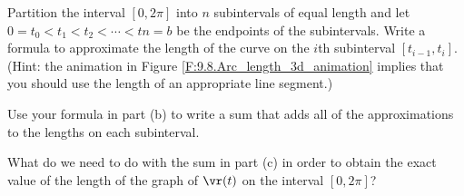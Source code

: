\begin{pa}

    \item Partition the interval $[0,2\pi]$ into $n$ subintervals of equal length and let $0 = t_0 < t_1 < t_2 < \cdots < tn = b$ be the endpoints of the subintervals. Write a formula to approximate the length of the curve on the $i$th subinterval $[t_{i-1},t_i]$. (Hint: the animation in Figure \ref{F:9.8.Arc_length_3d_animation} implies that you should use the length of an appropriate line segment.)

    \item Use your formula in part (b) to write a sum that adds all of the approximations to the lengths on each subinterval.

    \item What do we need to do with the sum in part (c) in order to obtain the exact value of the length of the graph of $\vr(t)$ on the interval $[0,2\pi]$?

    \ea


\end{pa} \afterpa 